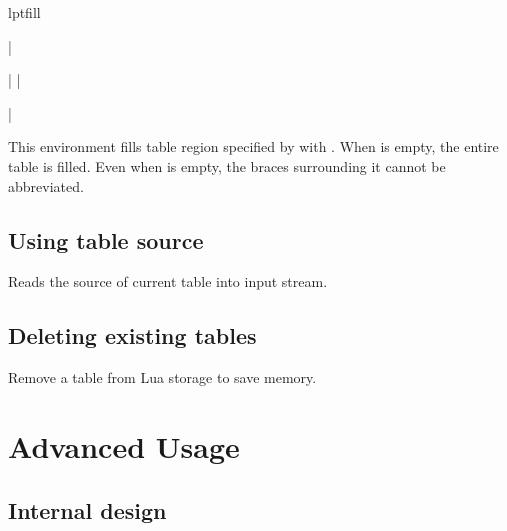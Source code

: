 \documentclass{l3doc}
\begin{document}
\begin{documentation}
\begin{environment}{lptfill}

\begin{syntax}
|\begin{lptfill}| 
|\end{lptfill}|
\end{syntax}

This environment fills table region specified by  with . When  is empty, the entire table is filled. Even when  is empty, the braces surrounding it cannot be abbreviated.

\end{environment}

\subsection{Using table source}

\begin{function}{\LPTUseTable}

\begin{syntax}
\end{syntax}

Reads the source of current table into input stream.

\end{function}

\subsection{Deleting existing tables}

\begin{function}{\LPTDeleteTable}

\begin{syntax}
 
\end{syntax}

Remove a table from Lua storage to save memory.

\end{function}

\section{Advanced Usage}

\subsection{Internal design}


\end{documentation}
\end{document}
